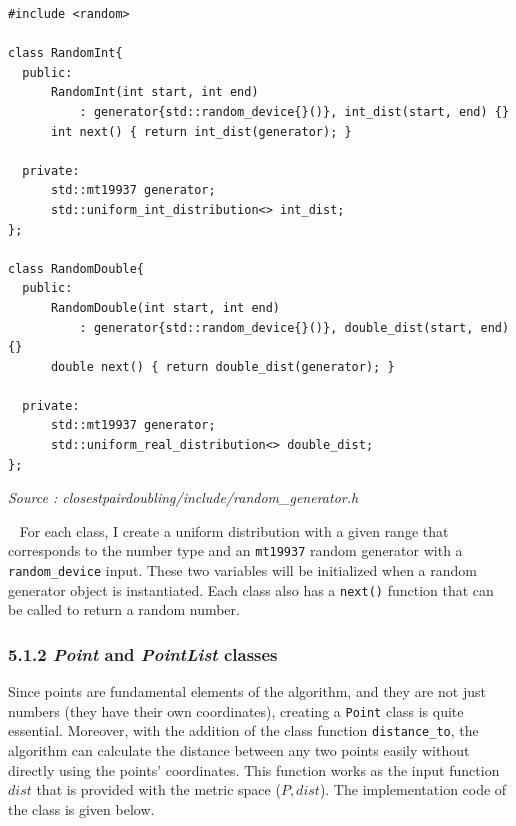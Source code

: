 \documentclass[12pt,english,]{article}
\newcommand{\code}[1]{\colorbox{light-gray}{\texttt{#1}}}
\begin{document}
\begin{lstlisting}
#include <random>

class RandomInt{
  public:
      RandomInt(int start, int end) 
          : generator{std::random_device{}()}, int_dist(start, end) {}
      int next() { return int_dist(generator); } 

  private:
      std::mt19937 generator;
      std::uniform_int_distribution<> int_dist;
};

class RandomDouble{
  public:
      RandomDouble(int start, int end) 
          : generator{std::random_device{}()}, double_dist(start, end) {}
      double next() { return double_dist(generator); } 

  private:
      std::mt19937 generator;
      std::uniform_real_distribution<> double_dist;
};
\end{lstlisting}
\vspace{-9truemm}
\begin{minipage}{1\textwidth}
  \begin{flushright}
  {\footnotesize \emph{Source \footnotemark: closestpairdoubling/include/random\_generator.h }\par}
  \end{flushright}
\end{minipage}
\vspace{0.5truemm}

~ For each class, I create a uniform distribution with a given range
that corresponds to the number type and an \code{mt19937} random
generator with a \code{random\_device} input. These two variables will
be initialized when a random generator object is instantiated. Each
class also has a \code{next()} function that can be called to return a
random number.

\hypertarget{section5.1.2}{%
\subsubsection{\texorpdfstring{5.1.2 \emph{Point} and \emph{PointList}
classes}{5.1.2  and  classes}}\label{section5.1.2}}

Since points are fundamental elements of the algorithm, and they are not
just numbers (they have their own coordinates), creating a \code{Point}
class is quite essential. Moreover, with the addition of the class
function \code{distance\_to}, the algorithm can calculate the distance
between any two points easily without directly using the points'
coordinates. This function works as the input function \(dist\) that is
provided with the metric space (\(P, dist\)). The implementation code of
the class is given below.
\end{document}
